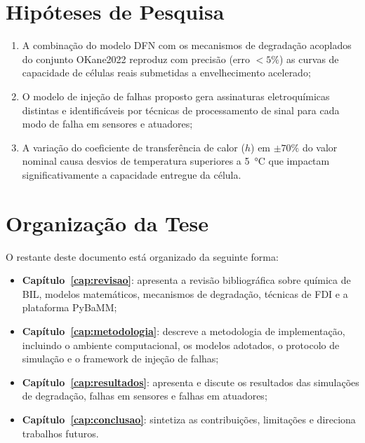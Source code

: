 \documentclass[
    12pt,
    openright,
    twoside,
    a4paper,
    brazil,
    english
]{abntex2}
\begin{document}
\section{Hipóteses de Pesquisa}

\begin{enumerate}[label=H\arabic*.]
  \item A combinação do modelo DFN com os mecanismos de degradação acoplados do
        conjunto OKane2022 reproduz com precisão (erro $< 5\%$) as curvas de
        capacidade de células reais submetidas a envelhecimento acelerado;
  \item O modelo de injeção de falhas proposto gera assinaturas eletroquímicas
        distintas e identificáveis por técnicas de processamento de sinal para cada
        modo de falha em sensores e atuadores;
  \item A variação do coeficiente de transferência de calor ($h$) em $\pm 70\%$
        do valor nominal causa desvios de temperatura superiores a \SI{5}{\celsius}
        que impactam significativamente a capacidade entregue da célula.
\end{enumerate}

\section{Organização da Tese}

O restante deste documento está organizado da seguinte forma:

\begin{itemize}
  \item \textbf{Capítulo~\ref{cap:revisao}}: apresenta a revisão bibliográfica
        sobre química de BIL, modelos matemáticos, mecanismos de degradação,
        técnicas de FDI e a plataforma PyBaMM;
  \item \textbf{Capítulo~\ref{cap:metodologia}}: descreve a metodologia de
        implementação, incluindo o ambiente computacional, os modelos adotados,
        o protocolo de simulação e o framework de injeção de falhas;
  \item \textbf{Capítulo~\ref{cap:resultados}}: apresenta e discute os resultados
        das simulações de degradação, falhas em sensores e falhas em atuadores;
  \item \textbf{Capítulo~\ref{cap:conclusao}}: sintetiza as contribuições,
        limitações e direciona trabalhos futuros.
\end{itemize}

\end{document}
